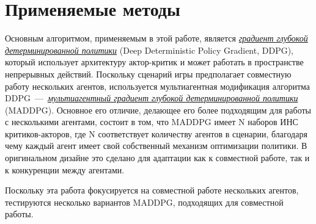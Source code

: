 \chapter{Применяемые методы} \label{ch3}

Основным алгоритмом, применяемым в этой работе, является \hyperref[acr:ddpg]{\textit{градиент глубокой детерминированной политики}} (Deep Deterministic Policy Gradient, DDPG), который использует архитектуру актор-критик и может работать в пространстве непрерывных действий. Поскольку сценарий игры предполагает совместную работу нескольких агентов, используется мультиагентная модификация алгоритма DDPG~---~\hyperref[acr:maddpg]{\textit{мультиагентный градиент глубокой детерминированной политики}} (MADDPG). Основное его отличие, делающее его более подходящим для работы с несколькими агентами, состоит в том, что MADDPG имеет N наборов ИНС критиков-акторов, где N соответствует количеству агентов в сценарии, благодаря чему каждый агент имеет свой собственный механизм оптимизации политики. В оригинальном дизайне \cite{lowe2017multiagent} это сделано для адаптации как к совместной работе, так и к конкуренции между агентами.

Поскольку эта работа фокусируется на совместной работе нескольких агентов, тестируются несколько вариантов MADDPG, подходящих для совместной работы.





\newpage
